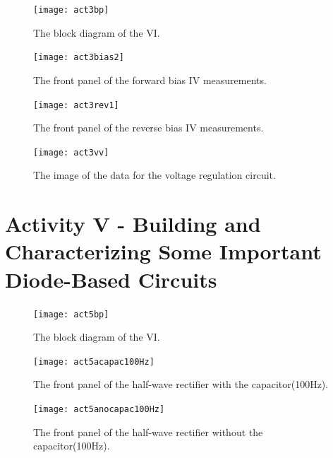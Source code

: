 \documentclass[11pt]{article}
\begin{document}
\begin{figure}[H]
 \begin{center}
  \texttt{[image: act3bp]}
  \caption{The block diagram of the VI.}
  \label{fig:act3bp}
 \end{center}
\end{figure}

\begin{figure}[H]
 \begin{center}
  \texttt{[image: act3bias2]}
  \caption{The front panel of the forward bias IV measurements.}
  \label{fig:act3bias2}
 \end{center}
\end{figure}

\begin{figure}[H]
 \begin{center}
  \texttt{[image: act3rev1]}
  \caption{The front panel of the reverse bias IV measurements.}
  \label{fig:act3rev1}
 \end{center}
\end{figure}

\begin{figure}[H]
 \begin{center}
  \texttt{[image: act3vv]}
  \caption{The image of the data for the voltage regulation circuit.}
  \label{fig:act3vv}
 \end{center}
\end{figure}

\section{Activity V - Building and Characterizing Some Important Diode-Based Circuits}

\begin{figure}[H]
 \begin{center}
  \texttt{[image: act5bp]}
  \caption{The block diagram of the VI.}
  \label{fig:act3bp}
 \end{center}
\end{figure}

\begin{figure}[H]
 \begin{center}
  \texttt{[image: act5acapac100Hz]}
  \caption{The front panel of the half-wave rectifier with the capacitor(100Hz).}
  \label{fig:act5acapac100Hz}
 \end{center}
\end{figure}

\begin{figure}[H]
 \begin{center}
  \texttt{[image: act5anocapac100Hz]}
  \caption{The front panel of the half-wave rectifier without the capacitor(100Hz).}
  \label{fig:act5anocapac100Hz}
 \end{center}
\end{figure}
\end{document}
